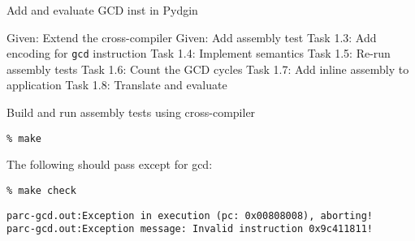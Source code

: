\begin{frame}{ Add and evaluate GCD inst in Pydgin}
\begin{cbxlist}
  \1 Given: Extend the cross-compiler
  \1 Given: Add assembly test
  \1 
  \1 
  \1 Task 1.3: Add encoding for \texttt{gcd} instruction
  \1 Task 1.4: Implement semantics
  \1 Task 1.5: Re-run assembly tests
  \1 Task 1.6: Count the GCD cycles
  \1 Task 1.7: Add inline assembly to application
  \1 Task 1.8: Translate and evaluate
\end{cbxlist}
\end{frame}


\begin{task}
\begin{frame}[fragile]{Build and run assembly tests using cross-compiler}

\begin{Verbatim}[commandchars=\\\{\}]
% cd \midtilde/pydgin-tut/parc/asm_tests_build
% make
\end{Verbatim}

The following should pass except for gcd:

\begin{verbatim}
% make check
\end{verbatim}

{\small
\begin{verbatim}
parc-gcd.out:Exception in execution (pc: 0x00808008), aborting!
parc-gcd.out:Exception message: Invalid instruction 0x9c411811!
\end{verbatim}}

\end{frame}
\end{task}


